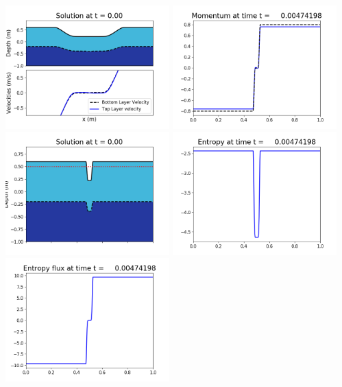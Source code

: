 \documentclass[11pt]{article}
\begin{document}
\includegraphics[width=0.475\textwidth]{frame0014fig1002.png}
\vskip 10pt 
\includegraphics[width=0.475\textwidth]{frame0014fig1003.png}
\includegraphics[width=0.475\textwidth]{frame0014fig1006.png}
\vskip 10pt 
\includegraphics[width=0.475\textwidth]{frame0014fig1007.png}
\includegraphics[width=0.475\textwidth]{frame0014fig1008.png}
\end{document}
